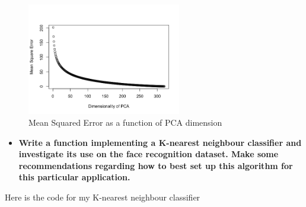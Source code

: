 \documentclass[11pt]{article}
\begin{document}
\begin{figure}[t!]
\caption{Mean Squared Error as a function of PCA dimension}
\centering
\includegraphics[width=0.6\textwidth]{mse}
\end{figure}
\begin{itemize}
\item \textbf{Write a function implementing a K-nearest neighbour classifier and investigate its use on the face recognition dataset. Make some recommendations regarding how to best set up this algorithm for this particular application.}
\end{itemize}
Here is the code for my K-nearest neighbour classifier 
\end{document}
